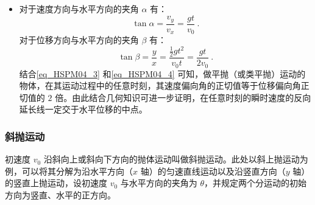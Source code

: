 \begin{itemize}
\item 对于速度方向与水平方向的夹角 $\alpha$ 有：
\begin{equation}\label{eq_HSPM04_3}
\tan \alpha = \frac {v_y}{v_x}=\frac{gt}{v_0}~.
\end{equation}
对于位移方向与水平方向的夹角 $\beta$ 有：
\begin{equation}\label{eq_HSPM04_4}
\tan \beta = \frac{y}{x}=\frac{\frac12 gt^2}{v_0t} = \frac{gt}{2v_0}~.
\end{equation}
结合\autoref{eq_HSPM04_3} 和\autoref{eq_HSPM04_4} 可知，做平抛（或类平抛）运动的物体，在其运动过程中的任意时刻，其速度偏向角的正切值等于位移偏向角正切值的 $2$ 倍。由此结合几何知识可进一步证明，在任意时刻的瞬时速度的反向延长线一定交于水平位移的中点。
\end{itemize}

\subsubsection{斜抛运动}

初速度 $v_0$ 沿斜向上或斜向下方向的抛体运动叫做斜抛运动。此处以斜上抛运动为例，可以将其分解为沿水平方向（$x$ 轴）的匀速直线运动以及沿竖直方向（$y$ 轴）的竖直上抛运动，设初速度 $v_0$ 与水平方向的夹角为 $\theta$，并规定两个分运动的初始方向为竖直、水平的正方向。


